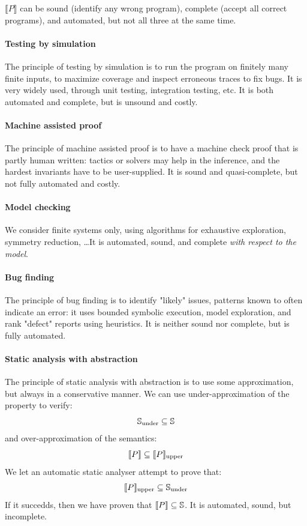 \documentclass[toc]{../cs-classes/cs-classes}
\begin{document}
$\llbracket P\rrbracket$ can be sound (identify any wrong program), complete (accept all correct programs), and automated, but not all three at the same time.

\paragraph*{Testing by simulation}
The principle of testing by simulation is to run the program on finitely many finite inputs, to maximize coverage and inspect erroneous traces to fix bugs. It is very widely used, through unit testing, integration testing, etc. It is both automated and complete, but is unsound and costly.

\paragraph*{Machine assisted proof}
The principle of machine assisted proof is to have a machine check proof that is partly human written: tactics or solvers may help in the inference, and the hardest invariants have to be user-supplied. It is sound and quasi-complete, but not fully automated and costly.

\paragraph*{Model checking}
We consider finite systems only, using algorithms for exhaustive exploration, symmetry reduction, \dots It is automated, sound, and complete \emph{with respect to the model}.

\paragraph*{Bug finding}
The principle of bug finding is to identify "likely" issues, patterns known to often indicate an error: it uses bounded symbolic execution, model exploration, and rank "defect" reports using heuristics. It is neither sound nor complete, but is fully automated.

\paragraph*{Static analysis with abstraction}
The principle of static analysis with abstraction is to use some approximation, but always in a conservative manner. We can use under-approximation of the property to verify:
\begin{equation*}
    \S_{\textnormal{under}}\subseteq\S
\end{equation*}
and over-approximation of the semantics:
\begin{equation*}
    \llbracket P\rrbracket\subseteq\llbracket P\rrbracket_{\textnormal{upper}}
\end{equation*}
We let an automatic static analyser attempt to prove that:
\begin{equation*}
    \llbracket P\rrbracket_{\textnormal{upper}}\subseteq\S_{\textnormal{under}}
\end{equation*}
If it succedds, then we have proven that $\llbracket P\rrbracket\subseteq\S$. It is automated, sound, but incomplete.
\end{document}
